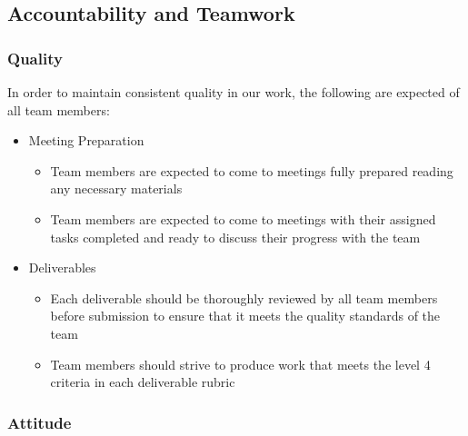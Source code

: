 \documentclass{article}
\begin{document}

\subsection*{Accountability and Teamwork}

\subsubsection*{Quality} 

In order to maintain consistent quality in our work, the following are expected 
of all team members:

\begin{itemize}
  \item Meeting Preparation
  \begin{itemize}
    \item Team members are expected to come to meetings fully prepared reading any 
    necessary materials
    \item Team members are expected to come to meetings with their assigned tasks 
    completed and ready to discuss their progress with the team
  \end{itemize}
  \item Deliverables
  \begin{itemize}
    \item Each deliverable should be thoroughly reviewed by all team members before 
    submission to ensure that it meets the quality standards of the team
    \item Team members should strive to produce work that meets the level 4 criteria 
    in each deliverable rubric
  \end{itemize}
\end{itemize}


\subsubsection*{Attitude}
\end{document}

